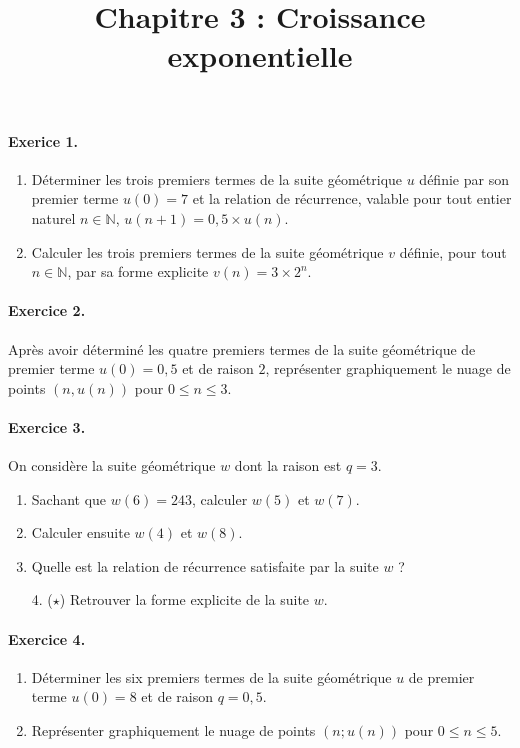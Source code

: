 \documentclass[11pt]{article}
\title{Chapitre 3 : Croissance exponentielle}
\date{}
\author{}
\begin{document}

\paragraph{Exerice 1.}
\begin{enumerate}
  \item Déterminer les trois premiers termes de la suite géométrique $u$ définie
    par son premier terme $u(0)=7$ et la relation de récurrence, valable pour
    tout entier naturel $n\in\mathbb{N}$, $u(n+1)=0,5\times u(n)$.
  \item Calculer les trois premiers termes de la suite géométrique $v$ définie,
    pour tout $n\in\mathbb{N}$, par sa forme explicite $v(n)=3\times 2^n$.
\end{enumerate}

\paragraph{Exercice 2.} Après avoir déterminé les quatre premiers termes de
la suite géométrique de premier terme $u(0)=0,5$ et de raison $2$, représenter
graphiquement le nuage de points $(n, u(n))$ pour $0\leq n\leq 3$.

\paragraph{Exercice 3.} On considère la suite géométrique $w$ dont la raison est
$q=3$.
\begin{enumerate}
  \item Sachant que $w(6)=243$, calculer $w(5)$ et $w(7)$.
  \item Calculer ensuite $w(4)$ et $w(8)$.
  \item Quelle est la relation de récurrence satisfaite par la suite $w$ ?
  \item[4. ($\star$)] Retrouver la forme explicite de la suite $w$.
\end{enumerate}

\paragraph{Exercice 4.}
\begin{enumerate}
  \item Déterminer les six premiers termes de la suite géométrique $u$ de
    premier terme $u(0)=8$ et de raison $q=0,5$.
  \item Représenter graphiquement le nuage de points $(n; u(n))$ pour $0\leq n
    \leq5$.
\end{enumerate}
\end{document}
